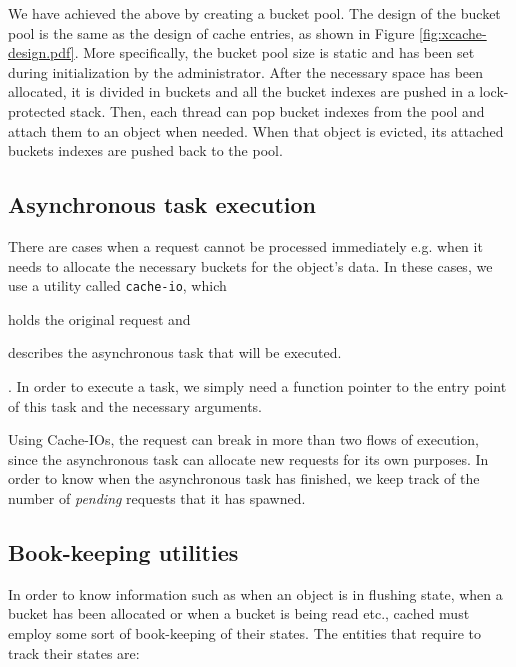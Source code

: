 We have achieved the above by creating a bucket pool. The design of the bucket 
pool is the same as the design of cache entries, as shown in Figure 
\ref{fig:xcache-design.pdf}. More specifically, the bucket pool size is static 
and has been set during initialization by the administrator. After the 
necessary space has been allocated, it is divided in buckets and all the bucket 
indexes are pushed in a lock-protected stack. Then, each thread can pop bucket 
indexes from the pool and attach them to an object when needed. When that 
object is evicted, its attached buckets indexes are pushed back to the pool.

\subsection{Asynchronous task execution}

There are cases when a request cannot be processed immediately e.g. when it 
needs to allocate the necessary buckets for the object's data. In these cases, 
we use a utility called \texttt{cache-io}, which
\begin{inparaenum}[(i)]
\item holds the original request and
\item describes the asynchronous task that will be executed.
\end{inparaenum}. In order to execute a task, we simply need a function pointer 
to the entry point of this task and the necessary arguments.

Using Cache-IOs, the request can break in more than two flows of execution, 
since the asynchronous task can allocate new requests for its own purposes.  In 
order to know when the asynchronous task has finished, we keep track of the 
number of \emph{pending} requests that it has spawned.

\subsection{Book-keeping utilities}\label{sec:cached-states-design}

In order to know information such as when an object is in flushing state, when 
a bucket has been allocated or when a bucket is being read etc., cached must 
employ some sort of book-keeping of their states. The entities that require to 
track their states are:

